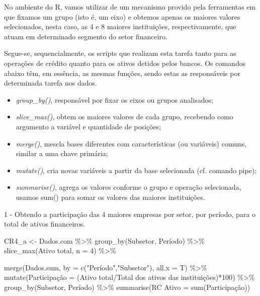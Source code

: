 \documentclass[
]{article}
\newenvironment{Shaded}{\begin{snugshade}}{\end{snugshade}}
\newcommand{\AttributeTok}[1]{\textcolor[rgb]{0.77,0.63,0.00}{#1}}
\newcommand{\DecValTok}[1]{\textcolor[rgb]{0.00,0.00,0.81}{#1}}
\newcommand{\FunctionTok}[1]{\textcolor[rgb]{0.00,0.00,0.00}{#1}}
\newcommand{\NormalTok}[1]{#1}
\newcommand{\OtherTok}[1]{\textcolor[rgb]{0.56,0.35,0.01}{#1}}
\newcommand{\SpecialCharTok}[1]{\textcolor[rgb]{0.00,0.00,0.00}{#1}}
\newcommand{\StringTok}[1]{\textcolor[rgb]{0.31,0.60,0.02}{#1}}
\providecommand{\tightlist}{%
  \setlength{\itemsep}{0pt}\setlength{\parskip}{0pt}}
\begin{document}
No ambiente do R, vamos utilizar de um mecanismo provido pela
ferramentas em que fixamos um grupo (isto é, um eixo) e obtemos apenas
os maiores valores selecionados, nesta caso, as 4 e 8 maiores
instituições, respectivamente, que atuam em determinado segmento do
setor financeiro.

Segue-se, sequencialmente, os scripts que realizam esta tarefa tanto
para as operações de crédito quanto para os ativos detidos pelos bancos.
Os comandos abaixo têm, em essência, as mesmas funções, sendo estas as
responsáveis por determinada tarefa nos dados.

\begin{itemize}
\tightlist
\item
  \emph{group\_by()}, responsável por fixar os eixos ou grupos
  analisados;
\item
  \emph{slice\_max()}, obtem os maiores valores de cada grupo, recebendo
  como argumento a variável e quantidade de posições;
\item
  \emph{merge()}, mescla bases diferentes com características (ou
  variáveis) comuns, similar a uma chave primária;
\item
  \emph{mutate()}, cria novas variáveis a partir da base selecionada
  (cf. comando pipe);
\item
  \emph{summarise()}, agrega os valores conforme o grupo e operação
  selecionada, usamos sum() para somar os valores das maiores
  instituições.
\end{itemize}

1 - Obtendo a participação das 4 maiores empresas por setor, por
período, para o total de ativos financeiros.

\begin{Shaded}
\begin{Highlighting}[]
\NormalTok{CR4\_a }\OtherTok{\textless{}{-}}\NormalTok{ Dados.com }\SpecialCharTok{\%\textgreater{}\%} 
  \FunctionTok{group\_by}\NormalTok{(Subsetor, Período) }\SpecialCharTok{\%\textgreater{}\%} 
  \FunctionTok{slice\_max}\NormalTok{(}\StringTok{\textasciigrave{}}\AttributeTok{Ativo total}\StringTok{\textasciigrave{}}\NormalTok{, }\AttributeTok{n =} \DecValTok{4}\NormalTok{) }\SpecialCharTok{\%\textgreater{}\%}   
  
  \FunctionTok{merge}\NormalTok{(Dados.sum, }\AttributeTok{by =} \FunctionTok{c}\NormalTok{(}\StringTok{"Período"}\NormalTok{,}\StringTok{"Subsetor"}\NormalTok{), }\AttributeTok{all.x =}\NormalTok{ T) }\SpecialCharTok{\%\textgreater{}\%}
  \FunctionTok{mutate}\NormalTok{(Participação }\OtherTok{=}\NormalTok{ (}\StringTok{\textasciigrave{}}\AttributeTok{Ativo total}\StringTok{\textasciigrave{}}\SpecialCharTok{/}\StringTok{\textasciigrave{}}\AttributeTok{Total dos ativos das instituições}\StringTok{\textasciigrave{}}\NormalTok{)}\SpecialCharTok{*}\DecValTok{100}\NormalTok{) }\SpecialCharTok{\%\textgreater{}\%}
  \FunctionTok{group\_by}\NormalTok{(Subsetor, Período) }\SpecialCharTok{\%\textgreater{}\%}
  \FunctionTok{summarise}\NormalTok{(}\StringTok{\textasciigrave{}}\AttributeTok{RC Ativo}\StringTok{\textasciigrave{}} \OtherTok{=} \FunctionTok{sum}\NormalTok{(Participação))}
\end{Highlighting}
\end{Shaded}
\end{document}
